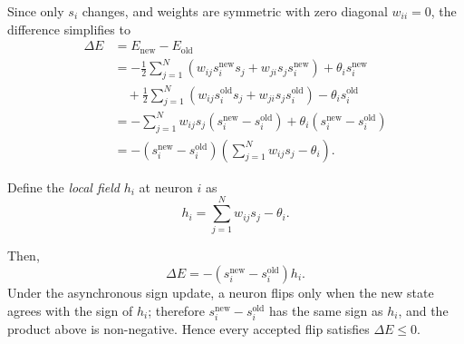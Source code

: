 Since only \( s_i \) changes, and weights are symmetric with zero diagonal \( w_{ii} = 0 \), the difference simplifies to
\begin{equation}
\begin{aligned}
    \Delta E &= E_{\text{new}} - E_{\text{old}} \\
    &= -\frac{1}{2} \sum_{j=1}^N \left( w_{ij} s_i^{\text{new}} s_j + w_{ji} s_j s_i^{\text{new}} \right) + \theta_i s_i^{\text{new}} \\
    &\quad + \frac{1}{2} \sum_{j=1}^N \left( w_{ij} s_i^{\text{old}} s_j + w_{ji} s_j s_i^{\text{old}} \right) - \theta_i s_i^{\text{old}} \\
    &= - \sum_{j=1}^N w_{ij} s_j \left( s_i^{\text{new}} - s_i^{\text{old}} \right) + \theta_i \left( s_i^{\text{new}} - s_i^{\text{old}} \right) \\
    &= - \left( s_i^{\text{new}} - s_i^{\text{old}} \right) \left( \sum_{j=1}^N w_{ij} s_j - \theta_i \right).
\end{aligned}
\label{eq:deltaE}
\end{equation}

Define the \emph{local field} \( h_i \) at neuron \( i \) as
\begin{equation}
    h_i = \sum_{j=1}^N w_{ij} s_j - \theta_i.
    \label{eq:local_field}
\end{equation}

Then,
\[
    \Delta E = - (s_i^{\text{new}} - s_i^{\text{old}}) h_i.
\]
Under the asynchronous sign update, a neuron flips only when the new state agrees with the sign of \(h_i\); therefore \(s_i^{\text{new}} - s_i^{\text{old}}\) has the same sign as \(h_i\), and the product above is non-negative. Hence every accepted flip satisfies \(\Delta E \le 0\).

